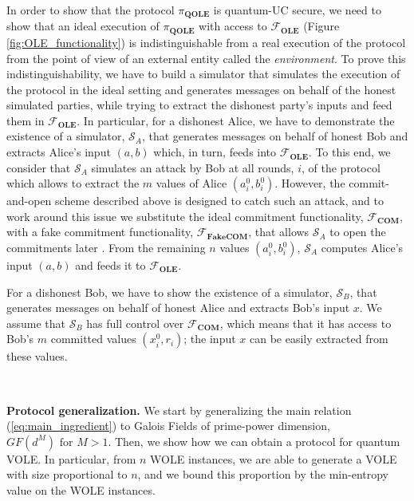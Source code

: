 In order to show that the protocol $\pi_{\textbf{QOLE}}$ is quantum-UC secure, we need to show that an ideal execution of $\pi_{\textbf{QOLE}}$ with access to $\mathcal{F}_{\textbf{OLE}}$ (Figure \ref{fig:OLE_functionality}) is indistinguishable from a real execution of the protocol from the point of view of an external entity called the \textit{environment}. To prove this indistinguishability, we have to build a simulator that simulates the execution of the protocol in the ideal setting and generates messages on behalf of the honest simulated parties,  while trying to extract the dishonest party's inputs and feed them in $\mathcal{F}_{\textbf{OLE}}$. In particular, for a dishonest Alice, we have to demonstrate the existence of a simulator, $\mathcal{S}_A$, that generates messages on behalf of honest Bob and extracts Alice's input $(a,b)$ which, in turn, feeds into $\mathcal{F}_{\textbf{OLE}}$.  To this end, we consider that $\mathcal{S}_A$ simulates an attack by Bob at all rounds, $i$, of the protocol  which allows to extract the $m$ values of Alice  $(a^0_i,b^0_i)$. However, the commit-and-open scheme described above is designed to catch such an attack, and to work around this issue we substitute the ideal commitment functionality, $\mathcal{F}_{\textbf{COM}}$, with a fake commitment functionality, $\mathcal{F}_{\textbf{FakeCOM}}$, that allows $\mathcal{S}_A$ to open the commitments later \cite{Unruh10}.  From the remaining $n$ values $(a^0_i,b^0_i)$, $\mathcal{S}_A$ computes Alice's input $(a,b)$ and feeds it to $\mathcal{F}_{\textbf{OLE}}$.

For a dishonest Bob, we have to show the existence of a simulator, $\mathcal{S}_B$, that generates messages on behalf of  honest Alice and extracts Bob's input $x$. We assume that $\mathcal{S}_B$ has full control over  $\mathcal{F}_{\textbf{COM}}$, which means that it has access to Bob's $m$ committed values $(x^0_i, r_i)$;  the input $x$ can be easily extracted from these values. %

\

\noindent\textbf{Protocol generalization.}  We start by generalizing   the main relation (\ref{eq:main_ingredient}) to Galois Fields of prime-power dimension, $GF(d^M) \text{ for }M>1$. Then, we show how we can obtain a protocol for quantum VOLE. In particular, from $n$ WOLE instances, we are able to generate a VOLE with size proportional to $n$, and we  bound this proportion by the min-entropy value on the WOLE instances.


